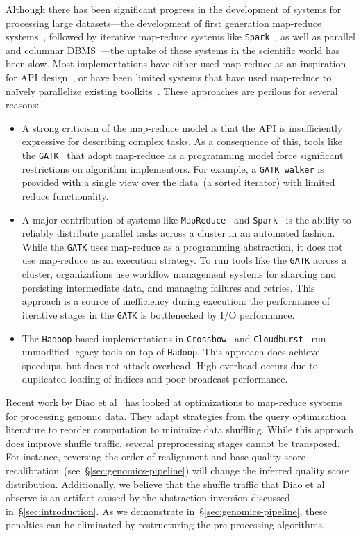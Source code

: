 \documentclass{acm_proc_article-sp}
\begin{document}
Although there has been significant progress in the development of systems for processing large
datasets---the development of first generation map-reduce systems~\cite{dean04}, followed by
iterative map-reduce systems like \texttt{Spark}~\cite{zaharia10}, as well as parallel and columnar
DBMS~\cite{abadi06, lamb12}---the uptake of these systems in the scientific world has been slow.
Most implementations have either used map-reduce as an inspiration for API
design~\cite{mckenna10}, or have been limited systems that have used map-reduce to na\"{i}vely
parallelize existing toolkits~\cite{langmead09, schatz09}. These approaches are perilous for several
reasons:

\begin{itemize}
\item A strong criticism of the map-reduce model is that the API is insufficiently expressive
for describing complex tasks. As a consequence of this, tools like the \texttt{GATK}~\cite{mckenna10} that
adopt map-reduce as a programming model force significant restrictions on algorithm implementors. For
example, a \texttt{GATK walker} is provided with a single view over the data~(a sorted iterator) with limited reduce
functionality.
\item A major contribution of systems like \texttt{MapReduce}~\cite{dean08} and \texttt{Spark}~\cite{zaharia10,
zaharia12} is the ability to reliably distribute parallel tasks across a cluster in an automated fashion. While
the \texttt{GATK} uses map-reduce as a programming abstraction, it does not use map-reduce as an execution strategy.
To run tools like the \texttt{GATK} across a cluster, organizations use workflow management systems for sharding and
persisting intermediate data, and managing failures and retries. This approach is a source of inefficiency during
execution: the performance of iterative stages in the \texttt{GATK} is bottlenecked by I/O performance.
\item The \texttt{Hadoop}-based implementations in \texttt{Crossbow}~\cite{langmead09} and
\texttt{Cloudburst}~\cite{schatz09} run unmodified legacy tools on top of \texttt{Hadoop}. This approach does
achieve speedups, but does not attack overhead. High overhead occurs due to duplicated loading of indices and poor
broadcast performance.
\end{itemize}

Recent work by Diao et al~\cite{diao15} has looked at optimizations to map-reduce systems for
processing genomic data. They adapt strategies from the query optimization literature to reorder
computation to minimize data shuffling. While this approach does improve shuffle traffic, several
preprocessing stages cannot be transposed. For instance, reversing the order of realignment and
base quality score recalibration~(see~\S\ref{sec:genomics-pipeline}) will change the inferred quality
score distribution. Additionally, we believe that the shuffle traffic that Diao et al observe is an artifact
caused by the abstraction inversion discussed in~\S\ref{sec:introduction}. As we demonstrate
in~\S\ref{sec:genomics-pipeline}, these penalties can be eliminated by restructuring the pre-processing
algorithms.
\end{document}
